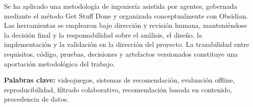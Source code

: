 Se ha aplicado una metodología de ingeniería asistida por agentes, gobernada mediante el método Get Stuff Done y organizada conceptualmente con Obsidian. Las herramientas se emplearon bajo dirección y revisión humana, manteniéndose la decisión final y la responsabilidad sobre el análisis, el diseño, la implementación y la validación en la dirección del proyecto. La trazabilidad entre requisitos, código, pruebas, decisiones y artefactos versionados constituye una aportación metodológica del trabajo.

\vspace{.5cm}
\textbf{Palabras clave:} videojuegos, sistemas de recomendación, evaluación offline, reproducibilidad, filtrado colaborativo, recomendación basada en contenido, procedencia de datos.
